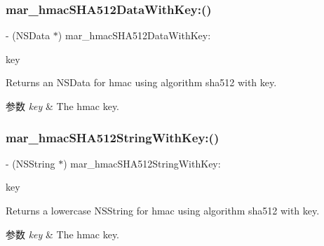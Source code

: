 \subsubsection{\texorpdfstring{mar\+\_\+hmac\+S\+H\+A512\+Data\+With\+Key\+:()}{mar\_hmacSHA512DataWithKey:()}}
{\footnotesize\ttfamily -\/ (N\+S\+Data $\ast$) mar\+\_\+hmac\+S\+H\+A512\+Data\+With\+Key\+: \begin{DoxyParamCaption}\item[{(N\+S\+Data $\ast$)}]{key }\end{DoxyParamCaption}}

Returns an N\+S\+Data for hmac using algorithm sha512 with key. 
\begin{DoxyParams}{参数}
{\em key} & The hmac key. \\
\hline
\end{DoxyParams}
\mbox{\label{category_n_s_data_07_m_a_r_e_x_08_adecf74c0fc38f4bf3d925fcb5f8b18d7}} 
\subsubsection{\texorpdfstring{mar\+\_\+hmac\+S\+H\+A512\+String\+With\+Key\+:()}{mar\_hmacSHA512StringWithKey:()}}
{\footnotesize\ttfamily -\/ (N\+S\+String $\ast$) mar\+\_\+hmac\+S\+H\+A512\+String\+With\+Key\+: \begin{DoxyParamCaption}\item[{(N\+S\+String $\ast$)}]{key }\end{DoxyParamCaption}}

Returns a lowercase N\+S\+String for hmac using algorithm sha512 with key. 
\begin{DoxyParams}{参数}
{\em key} & The hmac key. \\
\hline
\end{DoxyParams}
\mbox{\label{category_n_s_data_07_m_a_r_e_x_08_a33703701ff3634b954f97780782442ee}} 
